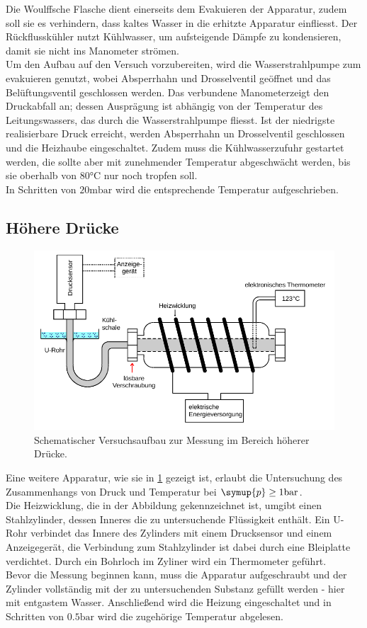 Die Woulffsche Flasche dient einerseits dem Evakuieren der Apparatur, zudem soll sie es verhindern,
dass kaltes Wasser in die erhitzte Apparatur einfliesst. Der Rückflusskühler nutzt Kühlwasser, um
aufsteigende Dämpfe zu kondensieren, damit sie nicht ins Manometer strömen. \\
Um den Aufbau auf den Versuch vorzubereiten, wird die Wasserstrahlpumpe zum evakuieren genutzt,
wobei Absperrhahn und Drosselventil geöffnet und das Belüftungsventil geschlossen werden.
Das verbundene Manometerzeigt den Druckabfall an; dessen Ausprägung ist abhängig von der
Temperatur des Leitungswassers, das durch die Wasserstrahlpumpe fliesst. Ist der niedrigste realisierbare
Druck erreicht, werden Absperrhahn un Drosselventil geschlossen und die Heizhaube eingeschaltet.
Zudem muss die Kühlwasserzufuhr gestartet werden, die sollte aber mit zunehmender Temperatur abgeschwächt 
werden, bis sie oberhalb von $80 \si{\degreeCelsius}$ nur noch tropfen soll.\\
In Schritten von $20 \si{\milli\bar}$ wird die entsprechende Temperatur aufgeschrieben.

\subsection{Höhere Drücke}
\begin{figure}
    \centering
    \includegraphics[width=\textwidth]{apparatur2.png}
    \caption{Schematischer Versuchsaufbau zur Messung im Bereich höherer Drücke.}
    \label{fig:app2}
\end{figure}
Eine weitere Apparatur, wie sie in \ref{fig:app2} gezeigt ist, erlaubt die Untersuchung des Zusammenhangs
von Druck und Temperatur bei $\symup{p} \geq 1 \si{\bar}$.\\
Die Heizwicklung, die in der Abbildung gekennzeichnet ist, umgibt einen Stahlzylinder, dessen Inneres
die zu untersuchende Flüssigkeit enthält. Ein U-Rohr verbindet das Innere des Zylinders mit einem Drucksensor
und einem Anzeigegerät, die Verbindung zum Stahlzylinder ist dabei durch eine Bleiplatte 
verdichtet. Durch ein Bohrloch im Zyliner wird ein Thermometer geführt.\\
Bevor die Messung beginnen kann, muss die Apparatur aufgeschraubt und der Zylinder vollständig mit
der zu untersuchenden Substanz gefüllt werden - hier mit entgastem Wasser. Anschließend wird die Heizung
eingeschaltet und in Schritten von $0.5 \si{\bar}$ wird die zugehörige Temperatur abgelesen.